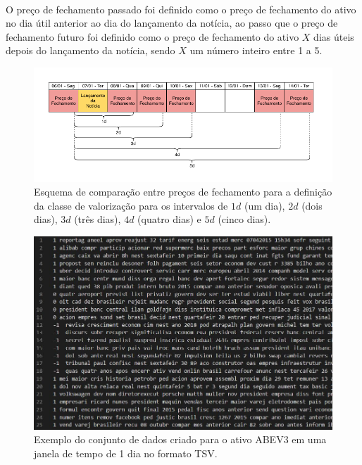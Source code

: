 \documentclass[grad,numbers]{coppe}
\begin{document}
  		\paragraph{}O preço de fechamento passado foi definido como o preço de fechamento do ativo no dia útil anterior ao dia do lançamento da notícia, ao passo que o preço de fechamento futuro foi definido como o preço de fechamento do ativo $X$ dias úteis depois do lançamento da notícia, sendo $X$ um número inteiro entre 1 a 5.
  		\begin{figure}[h]
  			\centering
  			{\includegraphics[width=16cm]{calendar-example.pdf}
	 				\caption{Esquema de comparação entre preços de fechamento para a definição da classe de valorização para os intervalos de $1d$ (um dia), $2d$ (dois dias), $3d$ (três dias), $4d$ (quatro dias) e $5d$ (cinco dias).}
	 				\label{fig:calendar-example-fig}}
  		\end{figure}
  		\begin{figure}[h]
  			\centering
  			{\includegraphics[width=14cm]{abev3_dataset_example}
  				\caption{Exemplo do conjunto de dados criado para o ativo ABEV3 em uma janela de tempo de 1 dia no formato TSV.}
  				\label{fig:abev3_dataset_example-fig}}
  		\end{figure}
\end{document}
